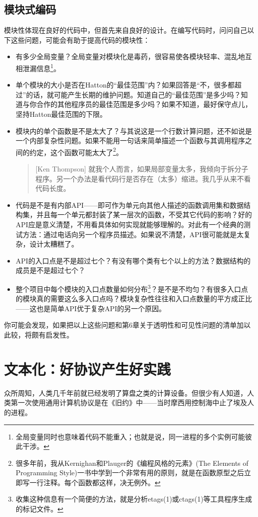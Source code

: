 \documentclass[12pt,oneside]{ctexbook}
\begin{document}
\begin{common-format}
\section{模块式编码}
模块性体现在良好的代码中，但首先来自良好的设计。在编写代码时，问问自己以下这些问题，可能会有助于提高代码的模块性：
\begin{itemize}
\item 有多少全局变量？全局变量对模块化是毒药，很容易使各模块轻率、混乱地互相泄漏信息\footnote{全局变量同时也意味着代码不能重入；也就是说，同一进程的多个实例可能彼此干涉。}。
\item 单个模块的大小是否在Hatton的“最佳范围”内？如果回答是“不，很多都超过”的话，就可能产生长期的维护问题。知道自己的“最佳范围”是多少吗？知道与你合作的其他程序员的最佳范围是多少吗？如果不知道，最好保守点儿，坚持Hatton最佳范围的下限。
\item 模块内的单个函数是不是太大了？与其说这是一个行数计算问题，还不如说是一个内部复杂性问题。如果不能用一句话来简单描述一个函数与其调用程序之间的约定，这个函数可能太大了\footnote{很多年前，我从Kernighan和Plauger的《编程风格的元素》(The Elements of Programming Style)一书中学到一个非常有用的原则，就是在函数原型之后立即写一行注释。每个函数都这样，决无例外。}。
\begin{quote}[Ken Thompson]
就我个人而言，如果局部变量太多，我倾向于拆分子程序。另一个办法是看代码行是否存在（太多）缩进。我几乎从来不看代码长度。
\end{quote}
\item 代码是不是有内部API——即可作为单元向其他人描述的函数调用集和数据结构集，并且每一个单元都封装了某一层次的函数，不受其它代码的影响？好的API应是意义清楚，不用看具体如何实现就能够理解的。对此有一个经典的测试方法：通过电话向另一个程序员描述。如果说不清楚，API很可能就是太复杂，设计太糟糕了。
\item API的入口点是不是超过七个？有没有哪个类有七个以上的方法？数据结构的成员是不是超过七个？
\item 整个项目中每个模块的入口点数量如何分布\footnote{收集这种信息有一个简便的方法，就是分析etags(1)或ctags(1)等工具程序生成的标记文件。}？是不是不均匀？有很多入口点的模块真的需要这么多入口点吗？模块复杂性往往和入口点数量的平方成正比——这也是简单API优于复杂API的另一个原因。
\end{itemize}

你可能会发现，如果把以上这些问题和第6章关于透明性和可见性问题的清单加以此较，将颇有启发性。



\chapter{文本化：好协议产生好实践}
\begin{flushright}
\begin{notecard}{27em}
 众所周知，人类几千年前就已经发明了算盘之类的计算设备。但很少有人知道，人类第一次使用通用计算机协议是在《旧约》中——当时摩西用控制海中止了埃及人的进程。


\end{notecard}
\end{flushright}
\end{common-format}
\end{document}

